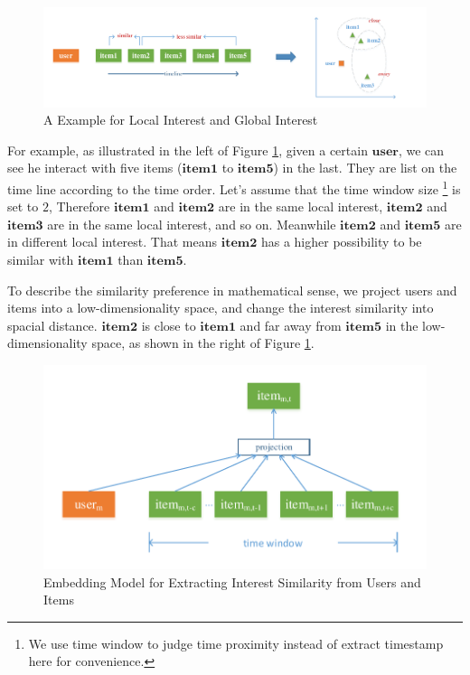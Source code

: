 \documentclass{sig-alternate-05-2015}
\begin{document}
\begin{figure}[htbp]
	\centering
	\includegraphics[scale=0.6]{images/1.pdf}
	\caption{A Example for Local Interest and Global Interest}
	\label{fig:example}
\end{figure}

For example, as illustrated in the left of Figure \ref{fig:example},
given a certain $\mathbf{user}$, we can see he interact with five items
($\mathbf{item1}$ to $\mathbf{item5}$) in the last.
They are list on the time line according to the time order.
Let's assume that the time window size \footnote{We use time window to judge time proximity
instead of extract timestamp here for convenience.} is set to $2$,
Therefore $\mathbf{item1}$ and $\mathbf{item2}$ are in the same local interest,
$\mathbf{item2}$ and $\mathbf{item3}$ are in the same local interest, and so on.
Meanwhile $\mathbf{item2}$ and $\mathbf{item5}$ are in different local interest.
That means $\mathbf{item2}$ has a higher possibility to be similar with $\mathbf{item1}$
than $\mathbf{item5}$.

To describe the similarity preference in mathematical sense,
we project users and items into a low-dimensionality space,
and change the interest similarity into spacial distance.
$\mathbf{item2}$ is close to $\mathbf{item1}$ and far away from $\mathbf{item5}$
in the low-dimensionality space, as shown in the right of Figure \ref{fig:example}.

\begin{figure}[htbp]
	\centering
	\includegraphics[scale=0.55]{images/2.pdf}
	\caption{Embedding Model for Extracting Interest Similarity from Users and Items}
	\label{fig:embedding}
\end{figure}
\end{document}
